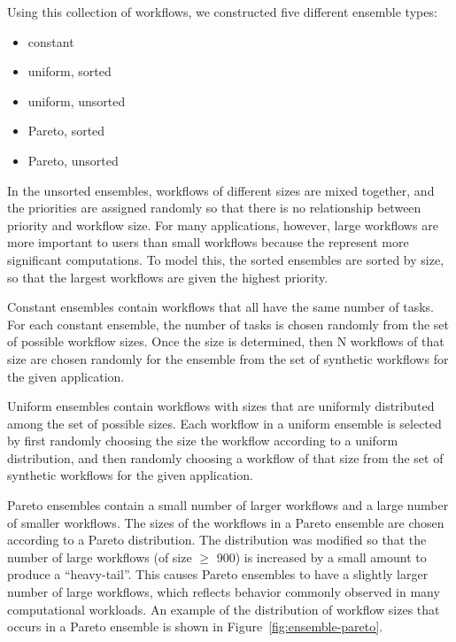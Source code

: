 \documentclass[conference]{IEEEtran}
\begin{document}
Using this collection of workflows, we constructed five different ensemble types:

\begin{itemize}
  \item constant
  \item uniform, sorted
  \item uniform, unsorted
  \item Pareto, sorted
  \item Pareto, unsorted
\end{itemize}

In the unsorted ensembles, workflows of different sizes are mixed together, and the priorities are assigned randomly so that there is no relationship between priority and workflow size. For many applications, however, large workflows are more important to users than small workflows because the represent more significant computations. To model this, the sorted ensembles are sorted by size, so that the largest workflows are given the highest priority.

Constant ensembles contain workflows that all have the same number of tasks. For each constant ensemble, the number of tasks is chosen randomly from the set of possible workflow sizes. Once the size is determined, then N workflows of that size are chosen randomly for the ensemble from the set of synthetic workflows for the given application.

Uniform ensembles contain workflows with sizes that are uniformly distributed among the set of possible sizes. Each workflow in a uniform ensemble is selected by first randomly choosing the size the workflow according to a uniform distribution, and then randomly choosing a workflow of that size from the set of synthetic workflows for the given application.

Pareto ensembles contain a small number of larger workflows and a large number of smaller workflows. The sizes of the workflows in a Pareto ensemble are chosen according to a Pareto distribution. The distribution was modified so that the number of large workflows (of size $\geq$ 900) is increased by a small amount to produce a ``heavy-tail''. This causes Pareto ensembles to have a slightly larger number of large workflows, which reflects behavior commonly observed in many computational workloads. An example of the distribution of workflow sizes that occurs in a Pareto ensemble is shown in Figure~\ref{fig:ensemble-pareto}.
\end{document}
